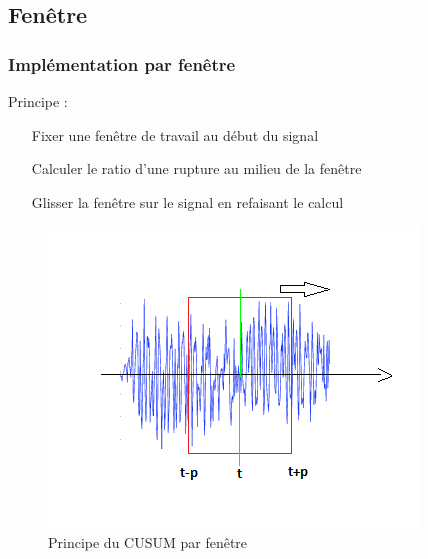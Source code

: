 \documentclass{beamer}
\begin{document}

\subsection{Fenêtre}

\begin{frame}

\frametitle{Implémentation par fenêtre}
Principe : %

\begin{itemize}
	\item[Fixer] une fenêtre de travail au début du signal
	\item[Calculer] le ratio d'une rupture au milieu de la fenêtre
	\item[Glisser] la fenêtre sur le signal en refaisant le calcul
\end{itemize}

\begin{figure}
	\includegraphics[scale=0.5]{diagramme_cusum_fen.png}
	\caption{Principe du CUSUM par fenêtre}
\end{figure}



\end{frame}
\end{document}
